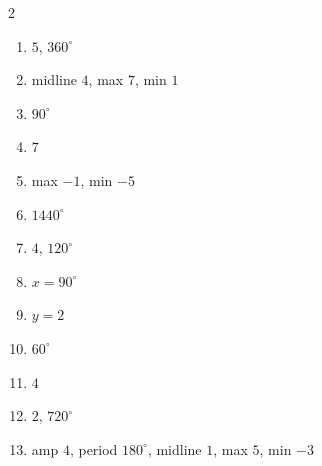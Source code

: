 \documentclass[11pt]{article}
\begin{document}
\begin{keybox}
\begin{multicols}{2}
\small
\begin{enumerate}[leftmargin=*,itemsep=3pt]
  \item $5$, $360^\circ$
  \item midline $4$, max $7$, min $1$
  \item $90^\circ$
  \item $7$
  \item max $-1$, min $-5$
  \item $1440^\circ$
  \item $4$, $120^\circ$
  \item $x=90^\circ$
  \item $y=2$
  \item $60^\circ$
  \item $4$
  \item $2$, $720^\circ$
  \item amp $4$, period $180^\circ$, midline $1$, max $5$, min $-3$
\end{enumerate}
\end{multicols}
\end{keybox}
\end{document}
